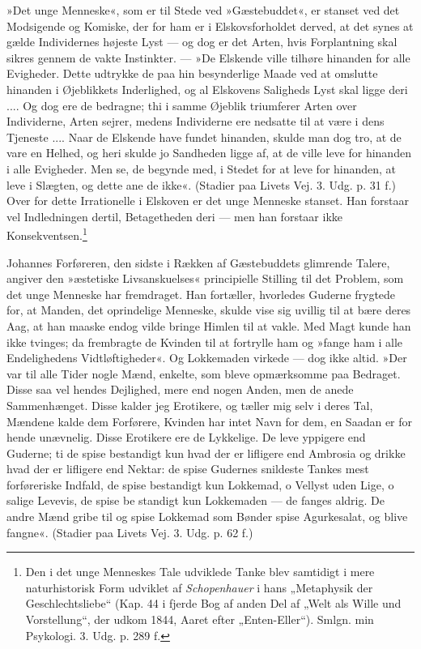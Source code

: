 \documentclass[12pt,a4paper,openany]{book}
\newcommand{\opage}[1]{\marginnote{\footnotesize\textit{[#1]}}}
\begin{document}
»Det unge Menneske«, som er til Stede ved »Gæstebuddet«,
er stanset ved det Modsigende og Komiske, der
for ham er i Elskovsforholdet derved, at det synes at
gælde Individernes højeste Lyst --- og dog er det Arten,
hvis Forplantning skal sikres gennem de vakte Instinkter.
--- »De Elskende ville tilhøre hinanden for alle Evigheder.
Dette udtrykke de paa hin besynderlige Maade ved at
omslutte hinanden i Øjeblikkets Inderlighed, og al
Elskovens Saligheds Lyst skal ligge deri .... Og dog
ere de bedragne; thi i samme Øjeblik triumferer Arten
over Individerne, Arten sejrer, medens Individerne ere
nedsatte til at være i dens Tjeneste .... Naar de
Elskende have fundet hinanden, skulde man dog tro, at
de vare en Helhed, og heri skulde jo Sandheden ligge
af, at de ville leve for hinanden i alle Evigheder. Men
\opage{87}se, de begynde med, i Stedet for at leve for hinanden,
at leve i Slægten, og dette ane de ikke«. (Stadier paa
Livets Vej. 3. Udg. p. 31 f.) Over for dette Irrationelle
i Elskoven er det unge Menneske stanset. Han
forstaar vel Indledningen dertil, Betagetheden deri ---
men han forstaar ikke Konsekventsen.\footnote{Den i det unge Menneskes Tale udviklede Tanke blev samtidigt i mere naturhistorisk Form udviklet af \textit{Schopenhauer} i hans „Metaphysik der Geschlechtsliebe“ (Kap. 44 i fjerde Bog af anden Del af „Welt als Wille und Vorstellung“, der udkom 1844, Aaret efter „Enten-Eller“). Smlgn. min Psykologi. 3. Udg. p. 289 f.}

Johannes Forføreren, den sidste i Rækken af Gæstebuddets
glimrende Talere, angiver den »æstetiske Livsanskuelses«
principielle Stilling til det Problem, som det
unge Menneske har fremdraget. Han fortæller, hvorledes
Guderne frygtede for, at Manden, det oprindelige Menneske,
skulde vise sig uvillig til at bære deres Aag, at
han maaske endog vilde bringe Himlen til at vakle.
Med Magt kunde han ikke tvinges; da frembragte de
Kvinden til at fortrylle ham og »fange ham i alle Endelighedens
Vidtløftigheder«. Og Lokkemaden virkede --- dog
ikke altid. »Der var til alle Tider nogle Mænd, enkelte,
som bleve opmærksomme paa Bedraget. Disse saa vel
hendes Dejlighed, mere end nogen Anden, men de anede
Sammenhænget. Disse kalder jeg Erotikere, og tæller
mig selv i deres Tal, Mændene kalde dem Forførere,
Kvinden har intet Navn for dem, en Saadan er for hende
unævnelig. Disse Erotikere ere de Lykkelige. De leve
yppigere end Guderne; ti de spise bestandigt kun hvad
der er lifligere end Ambrosia og drikke hvad der er lifligere
end Nektar: de spise Gudernes snildeste Tankes
mest forføreriske Indfald, de spise bestandigt kun Lokkemad,
o Vellyst uden Lige, o salige Levevis, de spise be%
\opage{88}standigt kun Lokkemaden --- de fanges aldrig. De andre
Mænd gribe til og spise Lokkemad som Bønder spise
Agurkesalat, og blive fangne«. (Stadier paa Livets Vej.
3. Udg. p. 62 f.)
\end{document}
